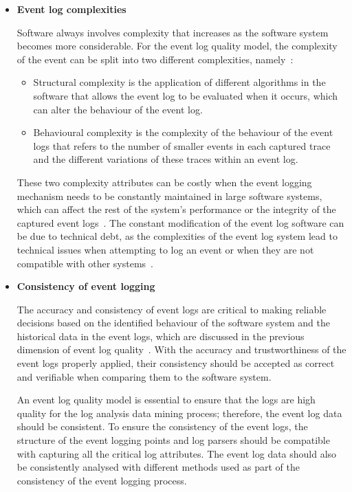 \begin{itemize}
	The accuracy and trustworthiness of the event log are more important than capturing the many available event logs in a software system~\cite{Zhu2015, Jans2012}. The additional unnecessary logs will also take up more storage space, increasing costs and possibly influencing the software system's performance.
	
	\clearpage

	\item \textbf{Event log complexities}\par Software always involves complexity that increases as the software system becomes more considerable. For the event log quality model, the complexity of the event can be split into two different complexities, namely~\cite{Kherbouche2017}:

	\begin{itemize}
		\item Structural complexity is the application of different algorithms in the software that allows the event log to be evaluated when it occurs, which can alter the behaviour of the event log.
		\item Behavioural complexity is the complexity of the behaviour of the event logs that refers to the number of smaller events in each captured trace and the different variations of these traces within an event log.
	\end{itemize}

	These two complexity attributes can be costly when the event logging mechanism needs to be constantly maintained in large software systems, which can affect the rest of the system’s performance or the integrity of the captured event logs~\cite{Ogheneovo2014}. The constant modification of the event log software can be due to technical debt, as the complexities of the event log system lead to technical issues when attempting to log an event or when they are not compatible with other systems~\cite{DeLeon-Sigg2020}.  

 	\item \textbf{Consistency of event logging}\par The accuracy and consistency of event logs are critical to making reliable decisions based on the identified behaviour of the software system and the historical data in the event logs, which are discussed in the previous dimension of event log quality~\cite{Stojanov2017, Kherbouche2017}. With the accuracy and trustworthiness of the event logs properly applied, their consistency should be accepted as correct and verifiable when comparing them to the software system. \par An event log quality model is essential to ensure that the logs are high quality for the log analysis data mining process; therefore, the event log data should be consistent. To ensure the consistency of the event logs, the structure of the event logging points and log parsers should be compatible with capturing all the critical log attributes. The event log data should also be consistently analysed with different methods used as part of the consistency of the event logging process.


\end{itemize}
